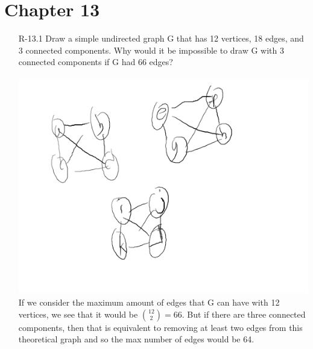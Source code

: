 \section{Chapter 13}

\begin{itemize}

      \item[R-13.1] Draw a simple undirected graph G that has 12 vertices, 18 edges, and 3
            connected components. Why would it be impossible to draw G with 3
            connected components if G had 66 edges? \\
            \answer \\
            \includegraphics[scale=0.6]{img/R-13_1.png} \\
            If we consider the maximum amount of edges that G can have with 12 vertices,
            we see that it would be $\binom{12}{2} = 66$. But if there are three connected components,
            then that is equivalent to removing at least two edges from this theoretical graph and so the
            max number of edges would be 64.


\end{itemize}

